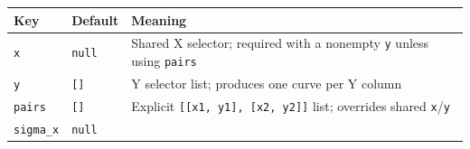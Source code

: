 \documentclass[
  10pt,
  a4paper,
  oneside]{scrreprt}
\begin{document}
\begin{longtable}[]{@{}lll@{}}
\toprule
\begin{minipage}[b]{0.30\columnwidth}\raggedright
Key\strut
\end{minipage} & \begin{minipage}[b]{0.30\columnwidth}\raggedright
Default\strut
\end{minipage} & \begin{minipage}[b]{0.30\columnwidth}\raggedright
Meaning\strut
\end{minipage}\tabularnewline
\midrule
\endhead
\begin{minipage}[t]{0.30\columnwidth}\raggedright
\texttt{x}\strut
\end{minipage} & \begin{minipage}[t]{0.30\columnwidth}\raggedright
\texttt{null}\strut
\end{minipage} & \begin{minipage}[t]{0.30\columnwidth}\raggedright
Shared X selector; required with a nonempty \texttt{y} unless using
\texttt{pairs}\strut
\end{minipage}\tabularnewline
\begin{minipage}[t]{0.30\columnwidth}\raggedright
\texttt{y}\strut
\end{minipage} & \begin{minipage}[t]{0.30\columnwidth}\raggedright
\texttt{{[}{]}}\strut
\end{minipage} & \begin{minipage}[t]{0.30\columnwidth}\raggedright
Y selector list; produces one curve per Y column\strut
\end{minipage}\tabularnewline
\begin{minipage}[t]{0.30\columnwidth}\raggedright
\texttt{pairs}\strut
\end{minipage} & \begin{minipage}[t]{0.30\columnwidth}\raggedright
\texttt{{[}{]}}\strut
\end{minipage} & \begin{minipage}[t]{0.30\columnwidth}\raggedright
Explicit \texttt{{[}{[}x1,\ y1{]},\ {[}x2,\ y2{]}{]}} list; overrides
shared \texttt{x}/\texttt{y}\strut
\end{minipage}\tabularnewline
\begin{minipage}[t]{0.30\columnwidth}\raggedright
\texttt{sigma\_x}\strut
\end{minipage} & \begin{minipage}[t]{0.30\columnwidth}\raggedright
\texttt{null}\strut

\end{minipage}
\end{longtable}
\end{document}
